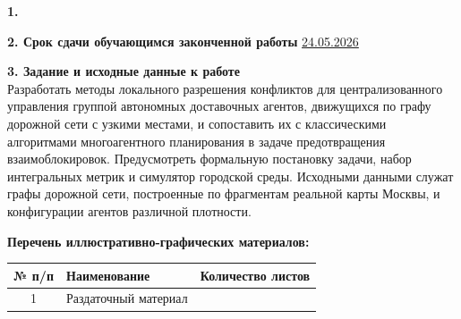 \documentclass[fontsize=12pt, master]{diploma}
\begin{document}
\fillTaskHeader

\vspace{-0.6cm}

\singlespacing

\textbf{1.} \makeThemeLine

\textbf{2. Срок сдачи обучающимся законченной работы} \uline{24.05.2026\hfill}

\textbf{3. Задание и исходные данные к работе}\\
Разработать методы локального разрешения конфликтов для централизованного управления группой
автономных доставочных агентов, движущихся по графу дорожной сети с узкими местами, и
сопоставить их с классическими алгоритмами многоагентного планирования в задаче предотвращения
взаимоблокировок. Предусмотреть формальную постановку задачи, набор интегральных метрик
и симулятор городской среды. Исходными данными служат графы
дорожной сети, построенные по фрагментам реальной карты Москвы, и конфигурации агентов различной
плотности.

\textbf{Перечень иллюстративно-графических материалов:}
\vspace{\parskip}
\begin{table}
    \begin{tabularx}{\textwidth}{|c|X|c|}\hline
    \textbf{№ п/п} & \centering\textbf{Наименование} & \textbf{Количество листов} \\ \hline
    1 & Раздаточный материал &  \\ \hline
    \end{tabularx}
\end{table}

\vfill\clearpage
{} %
\end{document}
